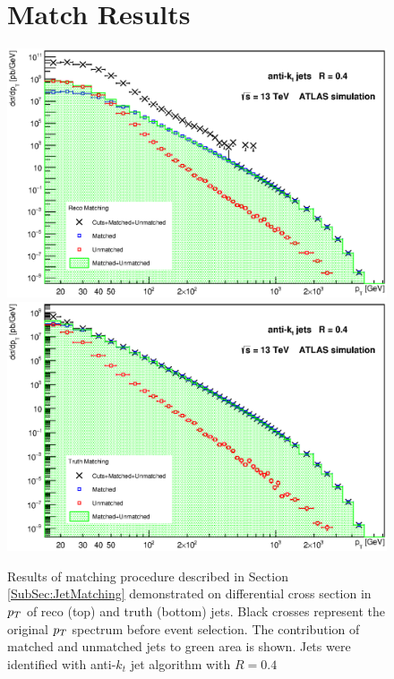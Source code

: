 \begin{appendices}
\begin{figure}[p]
\section{Match Results}
\label{sec:MatchResults}
  \centering
  \includegraphics[width=\textwidth]{Chapter3/SignalMatching.eps}
  \includegraphics[width=\textwidth]{Chapter3/TruthMatching.eps}
  \caption{Results of matching procedure described in Section
  \ref{SubSec:JetMatching} demonstrated on differential cross section in $p_{T}$ of
  reco (top) and truth (bottom) jets. Black crosses represent the original
  $p_{T}$ spectrum before event selection. The contribution of matched and unmatched jets to
  green area is shown. Jets were identified with anti-$k_t$ jet algorithm with
  $R=0.4$}
  \label{fig:Matching}
\end{figure}


\end{appendices}
